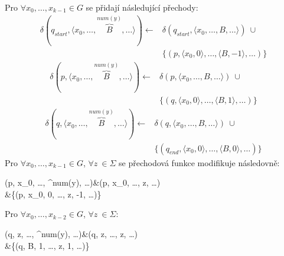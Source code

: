 \documentclass[thesis=B,czech]{FITthesis}[2019/12/23]
\theoremstyle{definition}
\begin{document}
\begin{enumerate}
{	Pro  $\forall x_0, \dots, x_{k-1} \in G$ se přidají následující přechody:
		\begin{equation*}\begin{split}\delta(q_{start}, \langle  x_0, \dots, \overbrace{B}^{num(y)}, \dots \rangle)\leftarrow&\delta(q_{start}, \langle  x_0, \dots, B, \dots \rangle) \ \cup\\&\{(p, \langle x_0, 0\rangle, \dots, \langle B, -1\rangle, \dots)\}\end{split}\end{equation*}
		\begin{equation*}\begin{split}\delta(p, \langle  x_0, \dots, \overbrace{B}^{num(y)}, \dots \rangle)\leftarrow&\delta(p, \langle  x_0, \dots, B, \dots \rangle) \ \cup\\&\{(q, \langle x_0, 0\rangle, \dots, \langle B, 1\rangle, \dots)\}\end{split}\end{equation*}
		\begin{equation*}\begin{split}\delta(q, \langle  x_0, \dots, \overbrace{B}^{num(y)}, \dots \rangle)\leftarrow&\delta(q, \langle  x_0, \dots, B, \dots \rangle) \ \cup\\&\{(q_{end}, \langle x_0, 0\rangle, \dots, \langle B, 0\rangle, \dots)\}\end{split}\end{equation*}
	Pro $\forall x_0, \dots, x_{k-1} \in G$,  $\forall z~\in \Sigma$ se přechodová funkce modifikuje následovně:
	\begin{flalign*}\delta(p, \langle  x_0, \dots, ^{num(y)}, \dots \rangle)\leftarrow&\delta(p, \langle  x_0, \dots, z, \dots \rangle) \ \cup\\&\{(p, \langle x_0, 0\rangle, \dots, \langle z, -1\rangle, \dots)\}\end{flalign*}
		Pro $\forall x_0, \dots, x_{k-2} \in G$,  $\forall z~\in \Sigma$:
	\begin{flalign*}\delta(q, \langle  z, \dots, ^{num(y)}, \dots \rangle)\leftarrow&\delta(q, \langle  z, \dots, z, \dots \rangle) \ \cup\\&\{(q, \langle B, 1\rangle, \dots, \langle z, 1\rangle, \dots)\}\end{flalign*}
	}


\end{enumerate}
\end{document}
